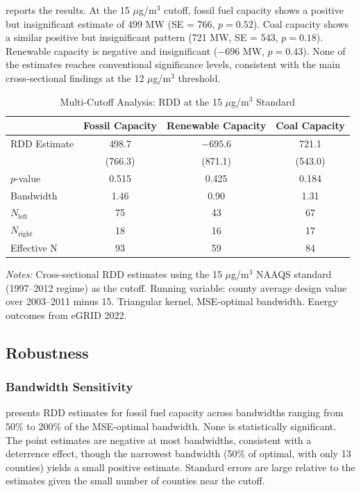 \documentclass[12pt]{article}
\begin{document}
 reports the results. At the 15 $\mu$g/m$^3$ cutoff, fossil fuel capacity shows a positive but insignificant estimate of 499 MW (SE = 766, $p = 0.52$). Coal capacity shows a similar positive but insignificant pattern (721 MW, SE = 543, $p = 0.18$). Renewable capacity is negative and insignificant ($-696$ MW, $p = 0.43$). None of the estimates reaches conventional significance levels, consistent with the main cross-sectional findings at the 12 $\mu$g/m$^3$ threshold.

\begin{table}[htbp]
\centering
\caption{Multi-Cutoff Analysis: RDD at the 15 $\mu$g/m$^3$ Standard}
\label{tab:multicutoff}
\begin{tabular}{lccc}
\toprule
 & Fossil Capacity & Renewable Capacity & Coal Capacity \\
\midrule
RDD Estimate & 498.7 & $-695.6$ & 721.1 \\
 & (766.3) & (871.1) & (543.0) \\
$p$-value & 0.515 & 0.425 & 0.184 \\
Bandwidth & 1.46 & 0.90 & 1.31 \\
$N_{\text{left}}$ & 75 & 43 & 67 \\
$N_{\text{right}}$ & 18 & 16 & 17 \\
Effective N & 93 & 59 & 84 \\
\bottomrule
\end{tabular}
\begin{tablenotes}
\small
\item \textit{Notes:} Cross-sectional RDD estimates using the 15 $\mu$g/m$^3$ NAAQS standard (1997--2012 regime) as the cutoff. Running variable: county average design value over 2003--2011 minus 15. Triangular kernel, MSE-optimal bandwidth. Energy outcomes from eGRID 2022.
\end{tablenotes}
\end{table}


\subsection{Robustness}

\subsubsection{Bandwidth Sensitivity}

 presents RDD estimates for fossil fuel capacity across bandwidths ranging from 50\% to 200\% of the MSE-optimal bandwidth. None is statistically significant. The point estimates are negative at most bandwidths, consistent with a deterrence effect, though the narrowest bandwidth (50\% of optimal, with only 13 counties) yields a small positive estimate. Standard errors are large relative to the estimates given the small number of counties near the cutoff.
\end{document}
